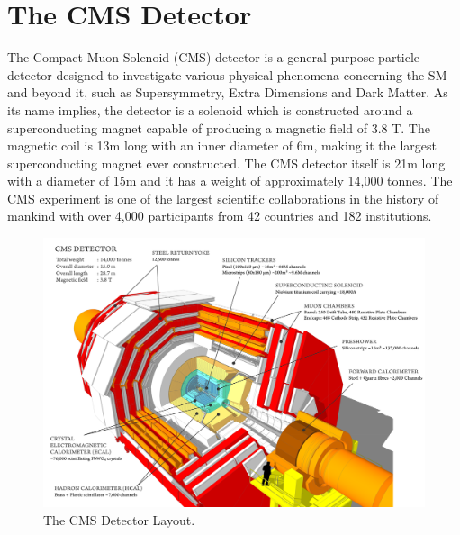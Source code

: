 \section{The CMS Detector}
The Compact Muon Solenoid (CMS) detector is a general purpose particle detector designed to investigate various physical phenomena concerning the SM and beyond it, such as Supersymmetry, Extra Dimensions and Dark Matter. As its name implies, the detector is a solenoid which is constructed around a superconducting magnet capable of producing a magnetic field of 3.8 T. The magnetic coil is 13m long with an inner diameter of 6m, making it the largest superconducting magnet ever constructed. The CMS detector itself is 21m long with a diameter of 15m and it has a weight of approximately 14,000 tonnes. The CMS experiment is one of the largest scientific collaborations in the history of mankind with over 4,000 participants from 42 countries and 182 institutions.\\

\begin{figure}[tb]
\includegraphics[width=1.0\textwidth]{CMSLayout.png} 
\caption{The CMS Detector Layout\cite{CMSlayout}.}
\label{CMSLayout} 
\hspace{4em}
\end{figure}


